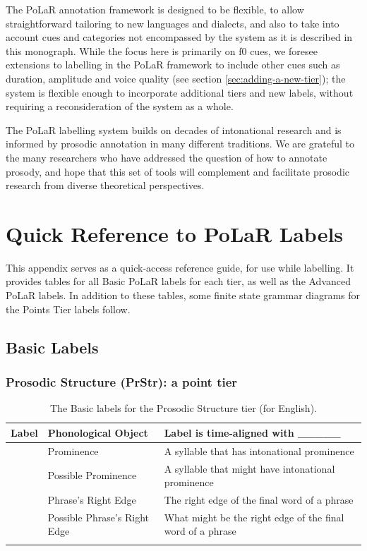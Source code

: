 \documentclass[11pt, twoside]{memoir}
\def\textlabel#1{{\relsize{-.5}\fontspec[Mapping=tex-text]{Roboto Mono}{#1}}}
\begin{document}
The PoLaR annotation framework is designed to be flexible, to allow straightforward tailoring to new languages and dialects, and also to take into account cues and categories not encompassed by the system as it is described in this monograph. While the focus here is primarily on f0 cues, we foresee extensions to labelling in the PoLaR framework to include other cues such as duration, amplitude and voice quality (see section \ref{sec:adding-a-new-tier}); the system is flexible enough to incorporate additional tiers and new labels, without requiring a reconsideration of the system as a whole.

The PoLaR labelling system builds on decades of intonational research and is informed by prosodic annotation in many different traditions. We are grateful to the many researchers who have addressed the question of how to annotate prosody, and hope that this set of tools will complement and facilitate prosodic research from diverse theoretical perspectives.





\appendix
\chapter{Quick Reference to PoLaR Labels}\label{sec:polar-quick-reference-to-labels}

This appendix serves as a quick-access reference guide, for use while labelling. It provides tables for all Basic PoLaR labels for each tier, as well as the Advanced PoLaR labels. In addition to these tables, some finite state grammar diagrams for the Points Tier labels follow.


\section*{Basic Labels}

\subsection*{Prosodic Structure (PrStr): a point tier}
\begin{longtable}{clp{.525\linewidth}} \toprule \textbf{Label} & \textbf{Phonological Object} & \textbf{Label is time-aligned with \_\_\_\_\_}\tabularnewline
\midrule \endhead
\textlabel{*} & Prominence & A syllable that has intonational prominence \tabularnewline
\textlabel{?*} & Possible Prominence & A syllable that might have intonational prominence \tabularnewline
\textlabel{]} & Phrase’s Right Edge & The right edge of the final word of a phrase \tabularnewline
\textlabel{?]} & Possible Phrase’s Right Edge & What might be the right edge of the final word of a phrase \tabularnewline
\bottomrule 
\caption{The Basic labels for the Prosodic Structure tier (for English).%
}
\end{longtable}
\end{document}
